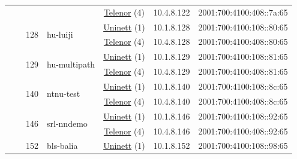 \begin{small}
\begin{center}
\begin{longtable}{|c|c|c|c|c|c|c|c|}
  &  &  &  & \multicolumn{2}{|c|}{\tiny{\href{https://www.telenor.no}{Telenor} (4)}} & \tiny{10.4.8.122} & \tiny{2001:700:4100:408::7a:65} \\* \cline{3-3}\cline{4-4}\cline{5-5}\cline{6-6}\cline{7-7}\cline{8-8}
  &  & \multirow{2}{*}{\tiny{128}} & \multicolumn{1}{|l|}{\multirow{2}{*}{\tiny{hu-luiji}}} & \multicolumn{2}{|c|}{\tiny{\href{https://www.uninett.no}{Uninett} (1)}} & \tiny{10.1.8.128} & \tiny{2001:700:4100:108::80:65} \\* \cline{5-5}\cline{6-6}\cline{7-7}\cline{8-8}
  &  &  &  & \multicolumn{2}{|c|}{\tiny{\href{https://www.telenor.no}{Telenor} (4)}} & \tiny{10.4.8.128} & \tiny{2001:700:4100:408::80:65} \\* \cline{3-3}\cline{4-4}\cline{5-5}\cline{6-6}\cline{7-7}\cline{8-8}
  &  & \multirow{2}{*}{\tiny{129}} & \multicolumn{1}{|l|}{\multirow{2}{*}{\tiny{hu-multipath}}} & \multicolumn{2}{|c|}{\tiny{\href{https://www.uninett.no}{Uninett} (1)}} & \tiny{10.1.8.129} & \tiny{2001:700:4100:108::81:65} \\* \cline{5-5}\cline{6-6}\cline{7-7}\cline{8-8}
  &  &  &  & \multicolumn{2}{|c|}{\tiny{\href{https://www.telenor.no}{Telenor} (4)}} & \tiny{10.4.8.129} & \tiny{2001:700:4100:408::81:65} \\* \cline{3-3}\cline{4-4}\cline{5-5}\cline{6-6}\cline{7-7}\cline{8-8}
  &  & \multirow{2}{*}{\tiny{140}} & \multicolumn{1}{|l|}{\multirow{2}{*}{\tiny{ntnu-test}}} & \multicolumn{2}{|c|}{\tiny{\href{https://www.uninett.no}{Uninett} (1)}} & \tiny{10.1.8.140} & \tiny{2001:700:4100:108::8c:65} \\* \cline{5-5}\cline{6-6}\cline{7-7}\cline{8-8}
  &  &  &  & \multicolumn{2}{|c|}{\tiny{\href{https://www.telenor.no}{Telenor} (4)}} & \tiny{10.4.8.140} & \tiny{2001:700:4100:408::8c:65} \\* \cline{3-3}\cline{4-4}\cline{5-5}\cline{6-6}\cline{7-7}\cline{8-8}
  &  & \multirow{2}{*}{\tiny{146}} & \multicolumn{1}{|l|}{\multirow{2}{*}{\tiny{srl-nndemo}}} & \multicolumn{2}{|c|}{\tiny{\href{https://www.uninett.no}{Uninett} (1)}} & \tiny{10.1.8.146} & \tiny{2001:700:4100:108::92:65} \\* \cline{5-5}\cline{6-6}\cline{7-7}\cline{8-8}
  &  &  &  & \multicolumn{2}{|c|}{\tiny{\href{https://www.telenor.no}{Telenor} (4)}} & \tiny{10.4.8.146} & \tiny{2001:700:4100:408::92:65} \\* \cline{3-3}\cline{4-4}\cline{5-5}\cline{6-6}\cline{7-7}\cline{8-8}
  &  & \multirow{2}{*}{\tiny{152}} & \multicolumn{1}{|l|}{\multirow{2}{*}{\tiny{bls-balia}}} & \multicolumn{2}{|c|}{\tiny{\href{https://www.uninett.no}{Uninett} (1)}} & \tiny{10.1.8.152} & \tiny{2001:700:4100:108::98:65} \\* \cline{5-5}\cline{6-6}\cline{7-7}\cline{8-8}

\end{longtable}
\end{center}
\end{small}
